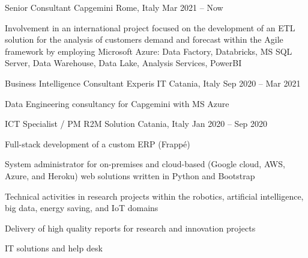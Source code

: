 
  \begin{cventries}
    \cventry
    {Senior Consultant}
    {Capgemini}    
    {Rome, Italy}
    {Mar 2021 -- Now}
    {
      \begin{cvitems}
        \item {Involvement in an international project focused on the development of an ETL solution for the analysis of customers demand and forecast within the Agile framework by employing Microsoft Azure: Data Factory, Databricks, MS SQL Server, Data Warehouse, Data Lake, Analysis Services, PowerBI}
      \end{cvitems}
    }

    \cventry
    {Business Intelligence Consultant}
    {Experis IT}    
    {Catania, Italy}
    {Sep 2020 -- Mar 2021}
    {
      \begin{cvitems}
        \item {Data Engineering consultancy for Capgemini with MS Azure}
      \end{cvitems}
    }

    \cventry
    {ICT Specialist / PM}
    {R2M Solution}    
    {Catania, Italy}
    {Jan 2020 -- Sep 2020}
    {
      \begin{cvitems}
        \item {Full-stack development of a custom ERP (Frappé)}
        \item {System administrator for on-premises and cloud-based (Google cloud, AWS, Azure, and Heroku) web solutions written in Python and Bootstrap}
        \item {Technical activities in research projects within the robotics, artificial intelligence, big data, energy saving, and IoT domains}
        \item {Delivery of high quality reports for research and innovation projects}
        \item {IT solutions and help desk}
      \end{cvitems}
    }



\end{cventries}
